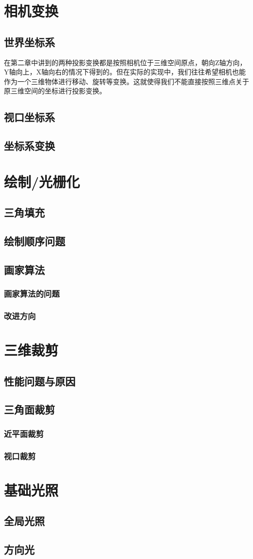\documentclass[12pt,oneside,a4paper]{ctexart}
\begin{document}
\section{相机变换}
\subsection{世界坐标系}
在第二章中讲到的两种投影变换都是按照相机位于三维空间原点，朝向Z轴方向，Y轴向上，X轴向右的情况下得到的。但在实际的实现中，我们往往希望相机也能作为一个三维物体进行移动、旋转等变换。这就使得我们不能直接按照三维点关于原三维空间的坐标进行投影变换。
\subsection{视口坐标系}
\subsection{坐标系变换}
\section{绘制/光栅化}
\subsection{三角填充}
\subsection{绘制顺序问题}
\subsection{画家算法}
\subsubsection{画家算法的问题}
\subsubsection{改进方向}
\newpage
\section{三维裁剪}
\subsection{性能问题与原因}
\subsection{三角面裁剪}
\subsubsection{近平面裁剪}
\subsubsection{视口裁剪}
\section{基础光照}
\subsection{全局光照}
\subsection{方向光}
\end{document}
